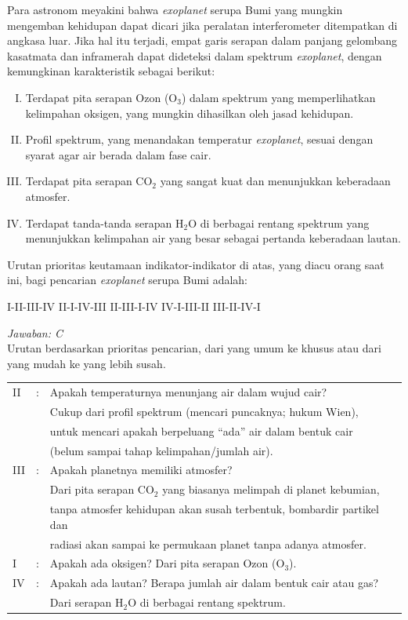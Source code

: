\documentclass[11pt,fleqn, a4paper]{exam}
\begin{document}
\begin{questions}
\vspace{0.5cm}
\question Para astronom meyakini bahwa \textit{exoplanet} serupa Bumi yang mungkin mengemban kehidupan dapat dicari jika peralatan interferometer ditempatkan di angkasa luar. Jika hal itu terjadi, empat garis serapan dalam panjang gelombang kasatmata dan inframerah dapat dideteksi dalam spektrum \textit{exoplanet}, dengan kemungkinan karakteristik sebagai berikut:
\begin{enumerate}[I.]
\item Terdapat pita serapan Ozon (O$_3$) dalam spektrum yang memperlihatkan kelimpahan oksigen, yang mungkin dihasilkan oleh jasad kehidupan.
\item Profil spektrum, yang menandakan temperatur \textit{exoplanet}, sesuai dengan syarat agar air berada dalam fase cair.
\item Terdapat pita serapan CO$_2$ yang sangat kuat dan menunjukkan keberadaan atmosfer.
\item Terdapat tanda-tanda serapan H$_2$O di berbagai rentang spektrum yang menunjukkan kelimpahan air yang besar sebagai pertanda keberadaan lautan.
\end{enumerate}
Urutan prioritas keutamaan indikator-indikator di atas, yang diacu orang saat ini, bagi pencarian \textit{exoplanet} serupa Bumi adalah:
\begin{choices}
\choice I-II-III-IV
\choice II-I-IV-III
\choice II-III-I-IV
\choice IV-I-III-II
\choice III-II-IV-I
\end{choices}

\textit{Jawaban: C}\\
Urutan berdasarkan prioritas pencarian, dari yang umum ke khusus atau dari yang mudah ke yang lebih susah.

\begin{tabular}{l c l}
II &:& Apakah temperaturnya menunjang air dalam wujud cair? \\
   & & Cukup dari profil spektrum (mencari puncaknya; hukum Wien),\\
   & & untuk mencari apakah berpeluang ``ada'' air dalam bentuk cair \\
   & & (belum sampai tahap kelimpahan/jumlah air).\\
III&:& Apakah planetnya memiliki atmosfer? \\
   & & Dari pita serapan CO$_{2}$ yang biasanya melimpah di planet kebumian,\\
   & & tanpa atmosfer kehidupan akan susah terbentuk, bombardir partikel dan \\
   & & radiasi akan sampai ke permukaan planet tanpa adanya atmosfer.\\
I  &:& Apakah ada oksigen? Dari pita serapan Ozon (O$_3$).\\
IV &:& Apakah ada lautan? Berapa jumlah air dalam bentuk cair atau gas?\\
   & & Dari serapan H$_{2}$O di berbagai rentang spektrum.
\end{tabular}




\end{questions}
\end{document}
